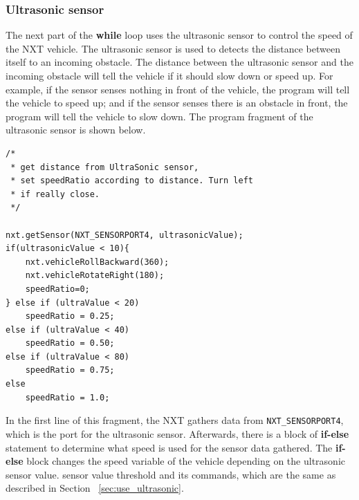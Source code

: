 \documentclass[11pt]{article}
\begin{document}
\subsubsection*{Ultrasonic sensor}
The next part of the {\bf while} loop uses the ultrasonic sensor to control the speed 
of the NXT vehicle. The ultrasonic sensor is used to detects the distance between 
itself to an incoming obstacle. The distance between the ultrasonic sensor and the 
incoming obstacle will tell the vehicle if it should slow down or speed up. For example, 
if the sensor senses nothing in front of the vehicle, the program will tell the vehicle 
to speed up; and if the sensor senses there is an obstacle in front, the program will 
tell the vehicle to slow down. The program fragment of the ultrasonic sensor is shown 
below.
\begin{lstlisting}
/* 
 * get distance from UltraSonic sensor, 
 * set speedRatio according to distance. Turn left 
 * if really close.
 */
       
nxt.getSensor(NXT_SENSORPORT4, ultrasonicValue);
if(ultrasonicValue < 10){
    nxt.vehicleRollBackward(360);
    nxt.vehicleRotateRight(180);
    speedRatio=0;
} else if (ultraValue < 20)	
    speedRatio = 0.25;
else if (ultraValue < 40)
    speedRatio = 0.50;
else if (ultraValue < 80)	
    speedRatio = 0.75;
else
    speedRatio = 1.0;
\end{lstlisting}
In the first line of this fragment, the NXT gathers data from {\tt NXT\_SENSORPORT4}, 
which is the port for the ultrasonic sensor. Afterwards, there is a block of {\bf if-else} 
statement to determine what speed is used for the sensor data gathered. The {\bf if-else} 
block changes the speed variable of the vehicle depending on the ultrasonic sensor value.
sensor value threshold and its commands, which are the same as described in Section~
\ref{sec:use_ultrasonic}.

\end{document}
